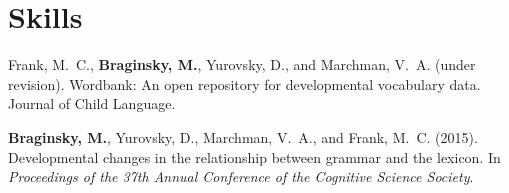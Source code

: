 \documentclass[11pt,letter]{moderncv}
\begin{document}
\section{Skills}

\vspace*{0.25em}


\renewcommand{\refname}{Publications}

\begin{small}
\begin{thebibliography}{}

Frank, M.~C., \textbf{Braginsky, M.}, Yurovsky, D., and Marchman, V.~A. (under revision).
\newblock Wordbank: An open repository for developmental vocabulary data. Journal of Child Language.

\textbf{Braginsky, M.}, Yurovsky, D., Marchman, V.~A., and Frank, M.~C. (2015).
\newblock Developmental changes in the relationship between grammar and the
  lexicon.
\newblock In {\em Proceedings of the 37th Annual Conference of the Cognitive
  Science Society}.

\end{thebibliography}
\end{small}

\renewcommand{\refname}{Posters and Talks}
\end{document}
